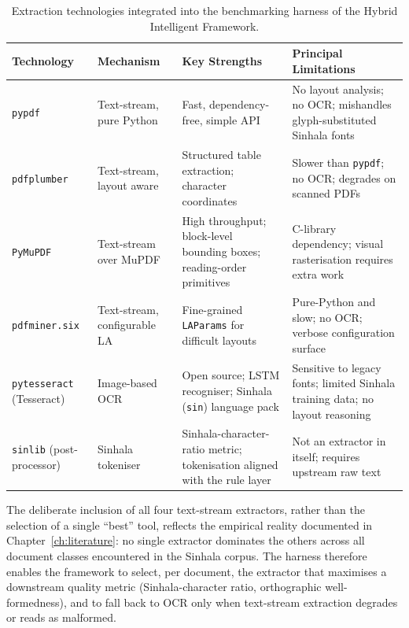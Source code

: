 \documentclass[12pt,a4paper,oneside]{report}
\begin{document}
\begin{table}[h]
\centering
\caption{Extraction technologies integrated into the benchmarking harness of the Hybrid Intelligent Framework.}
\label{tab:tech-extractors}
\renewcommand{\arraystretch}{1.25}
\footnotesize
\begin{tabularx}{\textwidth}{p{2.7cm} p{2.6cm} X X}
\hline
\textbf{Technology} & \textbf{Mechanism} & \textbf{Key Strengths} & \textbf{Principal Limitations} \\
\hline
\texttt{pypdf} & Text-stream, pure Python & Fast, dependency-free, simple API & No layout analysis; no OCR; mishandles glyph-substituted Sinhala fonts \\
\hline
\texttt{pdfplumber} & Text-stream, layout aware & Structured table extraction; character coordinates & Slower than \texttt{pypdf}; no OCR; degrades on scanned PDFs \\
\hline
\texttt{PyMuPDF} & Text-stream over MuPDF & High throughput; block-level bounding boxes; reading-order primitives & C-library dependency; visual rasterisation requires extra work \\
\hline
\texttt{pdfminer.six} & Text-stream, configurable LA & Fine-grained \texttt{LAParams} for difficult layouts & Pure-Python and slow; no OCR; verbose configuration surface \\
\hline
\texttt{pytesseract} (Tesseract) & Image-based OCR & Open source; LSTM recogniser; Sinhala (\texttt{sin}) language pack & Sensitive to legacy fonts; limited Sinhala training data; no layout reasoning \\
\hline
\texttt{sinlib} (post-processor) & Sinhala tokeniser & Sinhala-character-ratio metric; tokenisation aligned with the rule layer & Not an extractor in itself; requires upstream raw text \\
\hline
\end{tabularx}
\end{table}

The deliberate inclusion of all four text-stream extractors, rather than the selection of a single ``best'' tool, reflects the empirical reality documented in Chapter~\ref{ch:literature}: no single extractor dominates the others across all document classes encountered in the Sinhala corpus. The harness therefore enables the framework to select, per document, the extractor that maximises a downstream quality metric (Sinhala-character ratio, orthographic well-formedness), and to fall back to OCR only when text-stream extraction degrades or reads as malformed.
\end{document}
